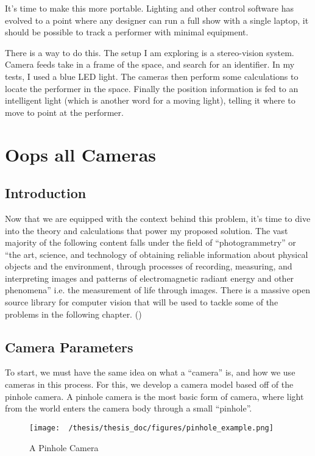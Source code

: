 \documentclass[12pt,twoside]{reedthesis}
\begin{document}
	It’s time to make this more portable. Lighting and other control software has evolved to a point where any designer can run a full show with a single laptop, it should be possible to track a performer with minimal equipment.
	
	There is a way to do this. The setup I am exploring is a stereo-vision system. Camera feeds take in a frame of the space, and search for an identifier. In my tests, I used a blue LED light. The cameras then perform some calculations to locate the performer in the space. Finally the position information is fed to an intelligent light (which is another word for a moving light), telling it where to move to point at the performer.



\chapter{Oops all Cameras}	
\section{Introduction}
	Now that we are equipped with the context behind this problem, it’s time to dive into the theory and calculations that power my proposed solution. The vast majority of the following content falls under the field of “photogrammetry” or “the art, science, and technology of obtaining reliable information about physical objects and the environment, through processes of recording, measuring, and interpreting images and patterns of electromagnetic radiant energy and other phenomena” i.e. the measurement of life through images. There is a massive open source library for computer vision that will be used to tackle some of the problems in the following chapter. (\cite{pulli_real-time_2012})
	
\section{Camera Parameters}
To start, we must have the same idea on what a “camera” is, and how we use cameras in this process. For this, we develop a camera model based off of the pinhole camera. A pinhole camera is the most basic form of camera, where light from the world enters the camera body through a small “pinhole”. 

\begin{figure}[h]
	   
	       \centering
	    \texttt{[image: ~/thesis/thesis\_doc/figures/pinhole\_example.png]}
	     \caption{A Pinhole Camera}
	 \label{A Pinhole Camera}
	\end{figure}
\end{document}
